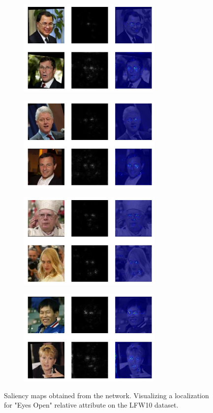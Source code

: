 \documentclass[10pt,twocolumn,letterpaper]{article}
\begin{document}
\begin{figure}
    \centering
    \begin{subfigure}
        \centering
        \includegraphics[width=7cm]{saliency-new/LFW/eyesopen-1}
    \end{subfigure}
    \begin{subfigure}
        \centering
        \includegraphics[width=7cm]{saliency-new/LFW/eyesopen-2}
    \end{subfigure}
    \begin{subfigure}
        \centering
        \includegraphics[width=7cm]{saliency-new/LFW/eyesopen-4}
    \end{subfigure}
    \begin{subfigure}
        \centering
        \includegraphics[width=7cm]{saliency-new/LFW/eyesopen-6}
    \end{subfigure}
    
    \caption{Saliency maps obtained from the network. Visualizing a localization for "Eyes Open" relative attribute on the LFW10 dataset.}
    \label{sal.lfw.eyesopen}
\end{figure}
\end{document}

